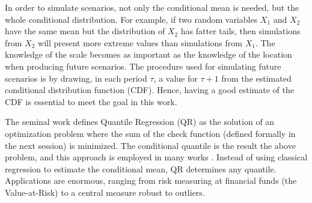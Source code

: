 In order to simulate scenarios, not only the conditional mean is needed, but the whole conditional distribution. For example, if two random variables $X_1$ and $X_2$ have the same mean but the distribution of $X_2$ has fatter tails, then simulations from $X_2$ will present more extreme values than simulations from $X_1$. The knowledge of the scale becomes as important as the knowledge of the location when producing future scenarios. The procedure used for simulating future scenarios is by drawing, in each period $\tau$, a value for $\tau+1$ from the estimated conditional distribution function (CDF). Hence, having a good estimate of the CDF is essential to meet the goal in this work. 

The seminal work \cite{koenker1978regression} defines Quantile Regression (QR) as the solution of an optimization problem where the sum of the check function (defined formally in the next session) is minimized. The conditional quantile is the result the above problem, and this approach is employed in many works \cite{chao_quantile_2012,li_quantile_2007,bosch_convergent_nodate,gallego2016line,moller_time-adaptive_2008,nielsen2006,bremnes_probabilistic_2004,wan_direct_2017}. Instead of using classical regression to estimate the conditional mean, QR determines any quantile. Applications are enormous, ranging from risk measuring at financial funds (the Value-at-Risk) to a central measure robust to outliers.







%






